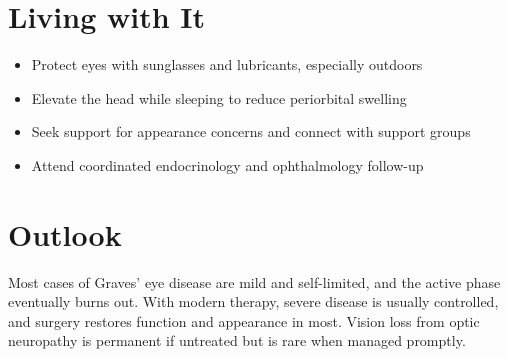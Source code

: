 \section{Living with It}
\begin{itemize}[noitemsep]
  \item Protect eyes with sunglasses and lubricants, especially outdoors
  \item Elevate the head while sleeping to reduce periorbital swelling
  \item Seek support for appearance concerns and connect with support groups
  \item Attend coordinated endocrinology and ophthalmology follow-up
\end{itemize}
\section{Outlook}
Most cases of Graves' eye disease are mild and self-limited, and the active phase eventually burns out. With modern therapy, severe disease is usually controlled, and surgery restores function and appearance in most. Vision loss from optic neuropathy is permanent if untreated but is rare when managed promptly.
